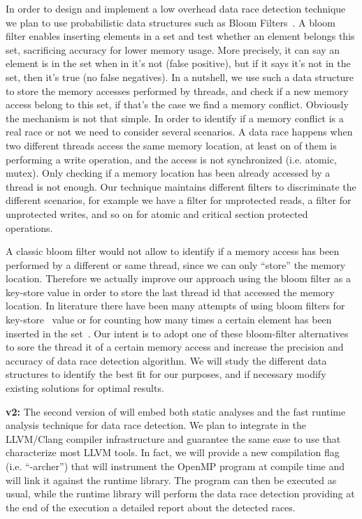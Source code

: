 In order to design and implement a low overhead data race detection technique
we plan to use probabilistic data structures such as Bloom
Filters~\cite{Bloom:1970:STH:362686.362692}.
%
A bloom filter enables inserting elements in a set and test whether an element
belongs this set, sacrificing accuracy for lower memory usage.
%
More precisely, it can say an element is in the set when in it’s not (false
positive), but if it says it’s not in the set, then it’s true (no false
negatives).
%
In a nutshell, we use such a data structure to store the memory accesses
performed by threads, and check if a new memory access belong to this set, if
that's the case we find a memory conflict.
%
Obviously the mechanism is not that simple.
%
In order to identify if a memory conflict is a real race or not we need to
consider several scenarios.
%
A data race happens when two different threads access the same memory
location, at least on of them is performing a write operation, and the access
is not synchronized (i.e. atomic, mutex).
%
Only checking if a memory location has been already accessed by a thread is
not enough.
%
Our technique maintains different filters to discriminate the different
scenarios, for example we have a filter for unprotected reads, a filter for
unprotected writes, and so on for atomic and critical section protected
operations.

A classic bloom filter would not allow to identify if a memory access has been
performed by a different or same thread, since we can only ``store'' the
memory location.
%
Therefore we actually improve our approach using the bloom filter as a
key-store value in order to store the last thread id that accessed the memory
location.
%
In literature there have been many attempts of using bloom filters for
key-store~\cite{6995996} value or for counting how many times a certain
element has been inserted in the set~\cite{Deng:2006:ADD:1142473.1142477}.
%
Our intent is to adopt one of these bloom-filter alternatives to sore the
thread it of a certain memory access and increase the precision and accuracy
of data race detection algorithm.
%
We will study the different data structures to identify the best fit for our
purposes, and if necessary modify existing solutions for optimal results.

\textbf{\archer v2:} The second version of \archer will embed both static
analyses and the fast runtime analysis technique for data race detection.
%
We plan to integrate \archer in the LLVM/Clang compiler infrastructure and
guarantee the same ease to use that characterize most LLVM tools.
%
In fact, we will provide a new compilation flag (i.e. ``-archer'') that will
instrument the OpenMP program at compile time and will link it against the
\archer runtime library.
%
The program can then be executed as usual, while the \archer runtime library
will perform the data race detection providing at the end of the execution a
detailed report about the detected races.

